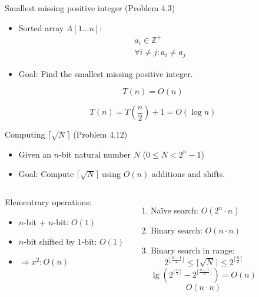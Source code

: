 \begin{frame}{Smallest missing positive integer (Problem 4.3)}
  \begin{itemize}
	\item Sorted array $A[1 \ldots n]$:
	  \begin{gather*}
		a_i \in \mathbb{Z}^{+} \\
		\forall i \neq j: a_i \neq a_j
	  \end{gather*}
	\item Goal: Find the smallest missing positive integer.
  \end{itemize}

  \pause
  \[
	T(n) = O(n)
  \]

  \pause
  \[
	T(n) = T(\frac{n}{2}) + 1 = O(\log n)
  \]
\end{frame}
\begin{frame}{Computing $\lceil \sqrt{N} \rceil$ (Problem 4.12)}
  \begin{itemize}
	\item Given an $n$-bit natural number $N$ ($0 \le N < 2^{n} - 1$)
	\item Goal: Compute $\lceil \sqrt{N} \rceil$ using $O(n)$ additions and shifts.
  \end{itemize}
     
  \vspace{0.30cm}
  \begin{columns}
	  \pause
	  \begin{block}{Elementrary operations:}
	    \begin{itemize}
	      \item $n$-bit + $n$-bit: $O(1)$
	      \item $n$-bit shifted by $1$-bit: $O(1)$
	      \item $\Rightarrow x^2: O(n)$
	    \end{itemize}
	  \end{block}
	  \pause
	  \begin{enumerate}[<+->]
	    \item Na{\"i}ve search: $O(2^{n} \cdot n)$
	    \item Binary search: $O(n \cdot n)$
	    \item Binary search in range:
		  \[
			2^{\lfloor \frac{n-1}{2} \rfloor} \le \lceil \sqrt{N} \rceil \le 2^{\lceil \frac{n}{2} \rceil}
		  \]
		  \[
			\lg{(2^{\lceil \frac{n}{2} \rceil} - 2^{\lfloor \frac{n-1}{2} \rfloor})} = O(n)
		  \]
		  \[ O(n \cdot n) \]
	  \end{enumerate}
  \end{columns}
\end{frame}
